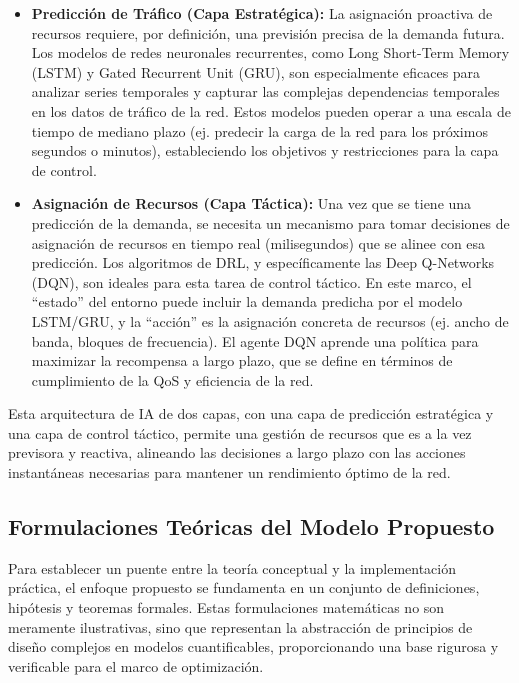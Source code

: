 \documentclass[12pt,a4paper]{article}
\begin{document}
\begin{itemize}
    \item \textbf{Predicción de Tráfico (Capa Estratégica):} La asignación proactiva de recursos requiere, por definición, una previsión precisa de la demanda futura. Los modelos de redes neuronales recurrentes, como Long Short-Term Memory (LSTM) y Gated Recurrent Unit (GRU), son especialmente eficaces para analizar series temporales y capturar las complejas dependencias temporales en los datos de tráfico de la red. Estos modelos pueden operar a una escala de tiempo de mediano plazo (ej. predecir la carga de la red para los próximos segundos o minutos), estableciendo los objetivos y restricciones para la capa de control\cite{ref37}.
    
    \item \textbf{Asignación de Recursos (Capa Táctica):} Una vez que se tiene una predicción de la demanda, se necesita un mecanismo para tomar decisiones de asignación de recursos en tiempo real (milisegundos) que se alinee con esa predicción. Los algoritmos de DRL, y específicamente las Deep Q-Networks (DQN), son ideales para esta tarea de control táctico. En este marco, el ``estado'' del entorno puede incluir la demanda predicha por el modelo LSTM/GRU, y la ``acción'' es la asignación concreta de recursos (ej. ancho de banda, bloques de frecuencia). El agente DQN aprende una política para maximizar la recompensa a largo plazo, que se define en términos de cumplimiento de la QoS y eficiencia de la red\cite{ref36}.
\end{itemize}

Esta arquitectura de IA de dos capas, con una capa de predicción estratégica y una capa de control táctico, permite una gestión de recursos que es a la vez previsora y reactiva, alineando las decisiones a largo plazo con las acciones instantáneas necesarias para mantener un rendimiento óptimo de la red.

\subsection{Formulaciones Teóricas del Modelo Propuesto}

Para establecer un puente entre la teoría conceptual y la implementación práctica, el enfoque propuesto se fundamenta en un conjunto de definiciones, hipótesis y teoremas formales. Estas formulaciones matemáticas no son meramente ilustrativas, sino que representan la abstracción de principios de diseño complejos en modelos cuantificables, proporcionando una base rigurosa y verificable para el marco de optimización.
\end{document}
